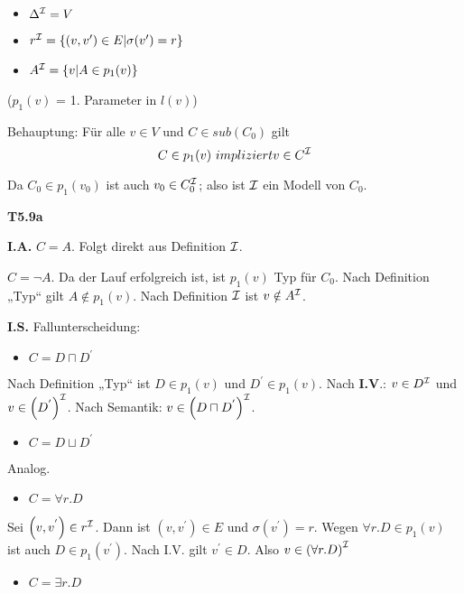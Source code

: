 \begin{itemize}
  \item $\Delta^{\mathcal{I}} = V$
  \item $r^{\mathcal{I}} = \{(v,v')\in E | \sigma (v') = r\}$
  \item $A^{\mathcal{I}} = \{v | A \in p_1(v)\}$
\end{itemize}

($p_1(v)$ = 1. Parameter in $l(v)$)

Behauptung: Für alle $v \in V$ und $C \in sub(C_0)$ gilt $$C \in p_1(v)\ impliziert v \in C^{\mathcal{I}}$$

Da $C_0 \in p_1(v_0)$ ist auch $v_0 \in C_0^{\mathcal{I}}$; also ist $\mathcal{I}$ ein Modell von $C_0$.

\textbf{T5.9a}

\textbf{I.A.} $C = A$. Folgt direkt aus Definition $\mathcal{I}$.

$C = \neg A$. Da der Lauf erfolgreich ist, ist
$p_1\left( v \right)$ Typ für $C_{0}$. Nach Definition „Typ`` gilt
$A \notin p_1\left( v \right)$. Nach Definition $\mathcal{I}$ ist
$v \notin A^{\mathcal{I}}$.

\textbf{I.S.} Fallunterscheidung:

\begin{itemize}
\item
  $C = D \sqcap D^{'}$
\end{itemize}

Nach Definition „Typ`` ist $D \in p_1\left( v \right)$ und
$D^{'} \in p_1\left( v \right)$. Nach \textbf{I.V}.: $v \in D^{\mathcal{I}}$
und $v \in \left( D^{'} \right)^{\mathcal{I}}$. Nach Semantik:
$v \in \left( D \sqcap D^{'} \right)^{\mathcal{I}}$.

\begin{itemize}
\item
  $C = D \sqcup D^{'}$
\end{itemize}

Analog.

\begin{itemize}
\item
  $C = \forall r.D$
\end{itemize}

Sei $\left( v,v^{'} \right) \in r^{\mathcal{I}}$. Dann ist
$\left( v,v^{'} \right) \in E$ und $\sigma\left( v^{'} \right) = r$.
Wegen $\forall r.D \in p_1(v)$ ist auch
$D \in p_1\left( v^{'} \right)$. Nach I.V. gilt $v^{'} \in D$.
Also $v \in \left( \forall r.D \right)^{\mathcal{I}}$

\begin{itemize}
\item
  $C = \exists r.D$
\end{itemize}

